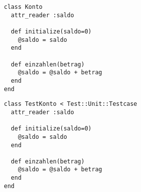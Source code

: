 \documentclass{beamer}
\begin{document}
\begin{frame}[containsverbatim]
  \begin{lstlisting}[fragile,frame=single,caption={konto.rb}]
class Konto
  attr_reader :saldo
  
  def initialize(saldo=0)
    @saldo = saldo
  end
    
  def einzahlen(betrag)
    @saldo = @saldo + betrag
  end
end
  \end{lstlisting}
\end{frame}

\begin{frame}[containsverbatim]
  \begin{lstlisting}[fragile,frame=single,caption={konto.rb}]
class TestKonto < Test::Unit::Testcase
  attr_reader :saldo
  
  def initialize(saldo=0)
    @saldo = saldo
  end
    
  def einzahlen(betrag)
    @saldo = @saldo + betrag
  end
end
  \end{lstlisting}
\end{frame}
\end{document}
